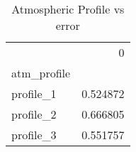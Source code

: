 \begin{table}
\caption{Atmospheric Profile vs error}
\begin{tabular}{lr}
 & 0 \\
atm_profile &  \\
profile_1 & 0.524872 \\
profile_2 & 0.666805 \\
profile_3 & 0.551757 \\
\end{tabular}
\end{table}
